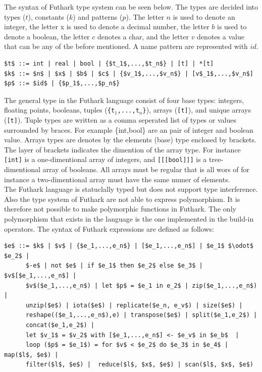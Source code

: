 \documentclass[11pt]{article}
\begin{document}
The syntax of Futhark type system can be seen below. The types are decided into types ($t$), constants ($k$) and patterns ($p$). The letter $n$ is used to denote an integer, the letter x is used to denote a decimal number, the letter $b$ is used to denote a boolean, the letter $c$ denotes a char, and the letter $v$ denotes a value that can be any of the before mentioned. A name pattern are represented with $id$. 
\begin{lstlisting}[numbers=none,frame=none]
$t$ ::= int | real | bool | {$t_1$,...,$t_n$} | [t] | *[t]
$k$ ::= $n$ | $x$ | $b$ | $c$ | {$v_1$,...,$v_n$} | [v$_1$,...,$v_n$] 
$p$ ::= $id$ | {$p_1$,...,$p_n$}
\end{lstlisting}
The general type in the Futhark language consist of four base types: integers, floating points, booleans, tuples ({\tt \{t$_1$,...,t$_n$\}}), arrays ({\tt [t]}), and unique arrays ({\tt *[t]}).
Tuple types are written as a comma seperated list of types or values surrounded by braces. For example \{int,bool\} are 
an pair of integer and boolean value. 
Arrays types are denotes by the elements (base) type enclosed by brackets. The layer of brackets indicates the dimention of the array type. For instance {\tt [int]} is a one-dimentional array of integers, and {\tt [[[bool]]]} is a tree-dimentional 
array of booleans.  All arrays must be regular that is all wors of for instance a two-dimentional array must have the same numer of elements. \\

The Futhark language is statuclally typed but does not support type interference. Also the type system of Futhark are not 
able to express polymorphism. It is therefore not possible to make polymorphic functions in Futhark. The only polymorphism that exists in the language is the one implemented in the build-in operators. 
The syntax of Futhark expressions are defined as follows:
\begin{lstlisting}[numbers=none,frame=none]
$e$ ::= $k$ | $v$ | {$e_1,...,e_n$} | [$e_1,...,e_n$] | $e_1$ $\odot$ $e_2$ |
      $-e$ | not $e$ | if $e_1$ then $e_2$ else $e_3$ | $v$[$e_1,...,e_n$] |
      $v$($e_1,...,e_n$) | let $p$ = $e_1 in e_2$ | zip($e_1,...,e_n$) | 
      unzip($e$) | iota($e$) | replicate($e_n, e_v$) | size($e$) |
      reshape(($e_1,...,e_n$),e) | transpose($e$) | split($e_1,e_2$) |
      concat($e_1,e_2$) | 
      let $v_1$ = $v_2$ with [$e_1,...,e_n$] <- $e_v$ in $e_b$  |
      loop ($p$ = $e_1$) = for $v$ < $e_2$ do $e_3$ in $e_4$ | map($l$, $e$) |
      filter($l$, $e$) |  reduce($l$, $x$, $e$) | scan($l$, $x$, $e$)
\end{lstlisting}
\end{document}
